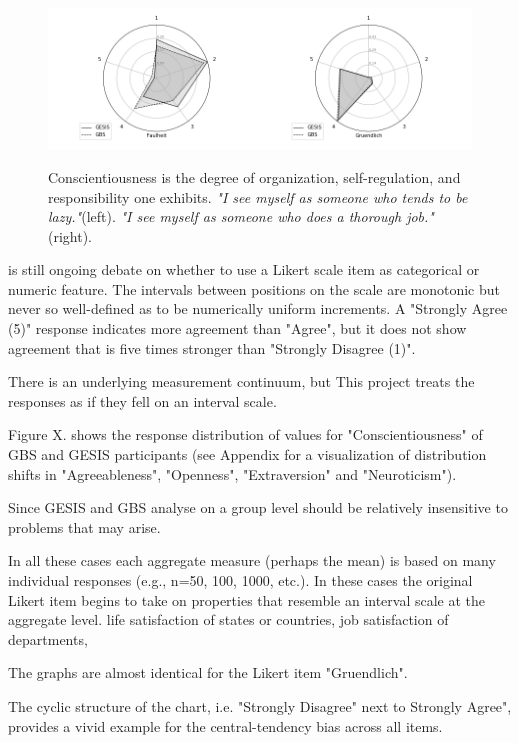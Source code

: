 \begin{figure}[H]
	\begin{center}
		\includegraphics[scale=0.52,angle=0]{fig/Conscientiousness_figure}
		\label{Conscientiousness}
		\caption{Conscientiousness is the degree of organization, self-regulation, and responsibility one exhibits. \textit{"I see myself as someone who tends to be lazy."}(left). \textit{"I see myself as someone who does a thorough job."}(right).}
	\end{center}
\end{figure}

 is still ongoing debate on whether to use a Likert scale item as categorical or numeric feature. The intervals between positions on the scale are monotonic but never so well-defined as to be numerically uniform increments. A "Strongly Agree (5)" response indicates more agreement than "Agree", but it does not show agreement that is five times stronger than "Strongly Disagree (1)". 

There is an underlying measurement continuum, but  
This project treats the responses as if they fell on an interval scale.

Figure X. shows the response distribution of values for "Conscientiousness" of GBS and GESIS participants (see Appendix for a visualization of distribution shifts in "Agreeableness", "Openness", "Extraversion" and "Neuroticism").

Since GESIS and GBS analyse  on a group level should be relatively insensitive to problems that may arise.

In all these cases each aggregate measure (perhaps the mean) is based on many individual responses (e.g., n=50, 100, 1000, etc.). In these cases the original Likert item begins to take on properties that resemble an interval scale at the aggregate level.
life satisfaction of states or countries,
job satisfaction of departments,

The graphs are almost identical for the Likert item "Gruendlich". 

The cyclic structure of the chart, i.e. "Strongly Disagree" next to Strongly Agree", provides a vivid example for the central-tendency bias across all items.

